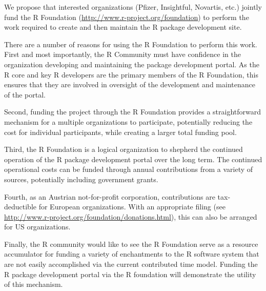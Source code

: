 \documentclass[12pt]{article}
\begin{document}
We propose that interested organizations (Pfizer, Insightful,
Novartis, etc.) jointly fund the R Foundation
(\url{http://www.r-project.org/foundation}) to perform the work
required to create and then maintain the R package development
site.

There are a number of reasons for using the R Foundation to
perform this work.  First and most importantly, the R Community
must have confidence in the organization developing and
maintaining the package development portal.  As the R core and key
R developers are the primary members of the R Foundation, this
ensures that they are involved in oversight of the development and
maintenance of the portal.

Second, funding the project through the R Foundation provides a
straightforward mechanism for a multiple organizations to
participate, potentially reducing the cost for individual
participants, while creating a larger total funding pool.

Third, the R Foundation is a logical organization to shepherd the
continued operation of the R package development portal over the
long term.  The continued operational costs can be funded through
annual contributions from a variety of sources, potentially
including government grants.

Fourth, as an Austrian not-for-profit corporation, contributions
are tax-deductible for European organizations.  With an
appropriate filing (see
\url{http://www.r-project.org/foundation/donations.html}),
 this can also be arranged for US organizations.

Finally, the R community would like to see the R Foundation serve
as a resource accumulator for funding a variety of enchantments to
the R software system that are not easily accomplished via the
current contributed time model.  Funding the R package development
portal via the R foundation will demonstrate the utility of this
mechanism.
\end{document}
